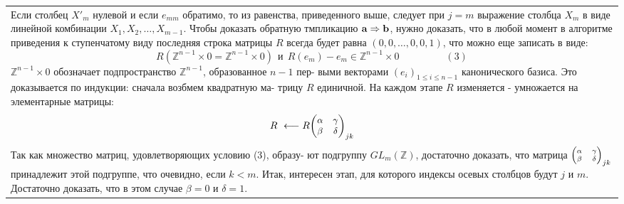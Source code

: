 	\pagebreak
	
	
	\begin{tabular}{|p{12.5cm}}
	\noindent
	Если столбец $X'_m$ нулевой и если $e_{mm}$ обратимо, то из равенства,\linebreak
	приведенного выше, следует при $j = m$ выражение столбца $X_m$ в\linebreak
	виде линейной комбинации $X_1, X_2, \ldots, X_{m - 1}$.\linebreak
	Чтобы доказать обратную тмпликацию ${\bf a \Rightarrow b}$, нужно доказать,\linebreak
	что в любой момент в алгоритме приведения к ступенчатому виду\linebreak
	последняя строка матрицы $R$ всегда будет равна $(0, 0, \ldots, 0, 0, 1)$,\linebreak
	что можно еще записать в виде:
	$$R({\mathbb Z}^{n - 1}\times 0 = {\mathbb Z}^{n - 1}\times 0) \ \  \text{и} \ \ R(e_m) - e_m \in {\mathbb Z}^{n - 1}\times 0 \ \ \ \ \ \ \ \ \ \ \ \ \ \ \ \ \ \ \ \ \ (3)$$
	${\mathbb Z}^{n - 1}\times 0$ обозначает подпространство ${\mathbb Z}^{n - 1}$, образованное $n - 1$ пер-\linebreak
	выми векторами $(e_i)_{1 \leqslant i \leqslant n - 1}$ канонического базиса.\newline
	Это доказывается по индукции: сначала возбмем квадратную ма-\linebreak
	трицу $R$ единичной. На каждом этапе $R$ изменяется - умножается\linebreak
	на элементарные матрицы:
	$$R \ \longleftarrow R{\small \begin{pmatrix} \alpha & \gamma\\ \beta & \delta \end{pmatrix}_{jk}}$$
	Так как множество матриц, удовлетворяющих условию (3), образу-\linebreak
	ют подгруппу $GL_m(\mathbb Z)$, достаточно доказать, что матрица ${\scriptsize \begin{pmatrix} \alpha & \gamma\\ \beta & \delta \end{pmatrix}_{jk}}$\linebreak
	принадлежит этой подгруппе, что очевидно, если $k < m$.\linebreak
	Итак, интересен этап, для которого индексы осевых столбцов будут\linebreak
	$j$ и $m$. Достаточно доказать, что в этом случае $\beta = 0$ и $\delta = 1$.\linebreak

\end{tabular}
